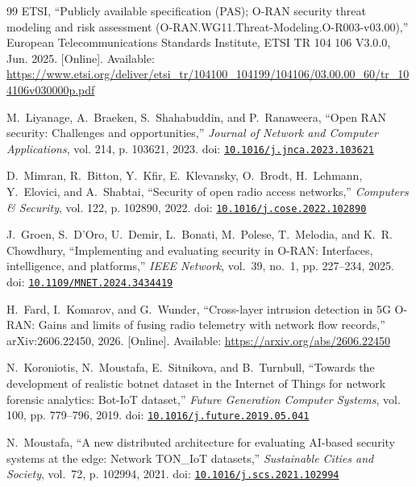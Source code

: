 \begin{thebibliography}{99}
\BIBentryALTinterwordspacing
{ETSI}, ``Publicly available specification ({PAS}); {O-RAN} security threat
  modeling and risk assessment ({O-RAN.WG11.Threat-Modeling.O-R003-v03.00}),''
  European Telecommunications Standards Institute, ETSI TR 104 106 V3.0.0, Jun.
  2025. [Online]. Available:
  \url{https://www.etsi.org/deliver/etsi_tr/104100_104199/104106/03.00.00_60/tr_104106v030000p.pdf}
\BIBentrySTDinterwordspacing

M.~Liyanage, A.~Braeken, S.~Shahabuddin, and P.~Ranaweera, ``Open {RAN}
  security: Challenges and opportunities,'' \emph{Journal of Network and
  Computer Applications}, vol. 214, p. 103621, 2023. doi:
  \href{https://doi.org/10.1016/j.jnca.2023.103621}{\nolinkurl{10.1016/j.jnca.2023.103621}}

D.~Mimran, R.~Bitton, Y.~Kfir, E.~Klevansky, O.~Brodt, H.~Lehmann, Y.~Elovici,
  and A.~Shabtai, ``Security of open radio access networks,'' \emph{Computers
  \& Security}, vol. 122, p. 102890, 2022. doi:
  \href{https://doi.org/10.1016/j.cose.2022.102890}{\nolinkurl{10.1016/j.cose.2022.102890}}

J.~Groen, S.~D'Oro, U.~Demir, L.~Bonati, M.~Polese, T.~Melodia, and K.~R.
  Chowdhury, ``Implementing and evaluating security in {O-RAN}: Interfaces,
  intelligence, and platforms,'' \emph{IEEE Network}, vol.~39, no.~1, pp.
  227--234, 2025. doi:
  \href{https://doi.org/10.1109/MNET.2024.3434419}{\nolinkurl{10.1109/MNET.2024.3434419}}

\BIBentryALTinterwordspacing
H.~Fard, I.~Komarov, and G.~Wunder, ``Cross-layer intrusion detection in {5G}
  {O-RAN}: Gains and limits of fusing radio telemetry with network flow
  records,'' arXiv:2606.22450, 2026. [Online]. Available:
  \url{https://arxiv.org/abs/2606.22450}
\BIBentrySTDinterwordspacing

N.~Koroniotis, N.~Moustafa, E.~Sitnikova, and B.~Turnbull, ``Towards the
  development of realistic botnet dataset in the {Internet of Things} for
  network forensic analytics: {Bot-IoT} dataset,'' \emph{Future Generation
  Computer Systems}, vol. 100, pp. 779--796, 2019. doi:
  \href{https://doi.org/10.1016/j.future.2019.05.041}{\nolinkurl{10.1016/j.future.2019.05.041}}

N.~Moustafa, ``A new distributed architecture for evaluating {AI}-based
  security systems at the edge: Network {TON\_IoT} datasets,''
  \emph{Sustainable Cities and Society}, vol.~72, p. 102994, 2021. doi:
  \href{https://doi.org/10.1016/j.scs.2021.102994}{\nolinkurl{10.1016/j.scs.2021.102994}}


\end{thebibliography}
